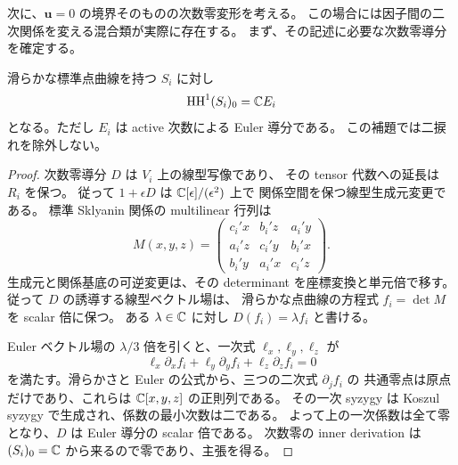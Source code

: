 次に、$\mathbf u=0$ の境界そのものの次数零変形を考える。
この場合には因子間の二次関係を変える混合類が実際に存在する。
まず、その記述に必要な次数零導分を確定する。

\begin{lemma}
\label{ifh:lem:euler}
滑らかな標準点曲線を持つ $S_i$ に対し
\[
            \operatorname{HH}^1(S_i)_0=\mathbb C E_i
\]
となる。ただし $E_i$ は active 次数による Euler 導分である。
この補題では二捩れを除外しない。
\end{lemma}

\begin{proof}
次数零導分 $D$ は $V_i$ 上の線型写像であり、
その tensor 代数への延長は $R_i$ を保つ。
従って $1+\epsilon D$ は $\mathbb C[\epsilon]/(\epsilon^2)$ 上で
関係空間を保つ線型生成元変更である。
標準 Sklyanin 関係の multilinear 行列は
\[
 M(x,y,z)=
 \begin{pmatrix}
 c_i'x&b_i'z&a_i'y\\
 a_i'z&c_i'y&b_i'x\\
 b_i'y&a_i'x&c_i'z
 \end{pmatrix}.
\]
生成元と関係基底の可逆変更は、その determinant を座標変換と単元倍で移す。
従って $D$ の誘導する線型ベクトル場は、
滑らかな点曲線の方程式 $f_i=\det M$ を scalar 倍に保つ。
ある $\lambda\in\mathbb C$ に対し $D(f_i)=\lambda f_i$ と書ける。

Euler ベクトル場の $\lambda/3$ 倍を引くと、一次式 $\ell_x,\ell_y,\ell_z$ が
\[
             \ell_x\partial_xf_i+
             \ell_y\partial_yf_i+
             \ell_z\partial_zf_i=0
\]
を満たす。滑らかさと Euler の公式から、三つの二次式 $\partial_jf_i$ の
共通零点は原点だけであり、これらは $\mathbb C[x,y,z]$ の正則列である。
その一次 syzygy は Koszul syzygy で生成され、係数の最小次数は二である。
よって上の一次係数は全て零となり、$D$ は Euler 導分の scalar 倍である。
次数零の inner derivation は $(S_i)_0=\mathbb C$ から来るので零であり、主張を得る。
\end{proof}


